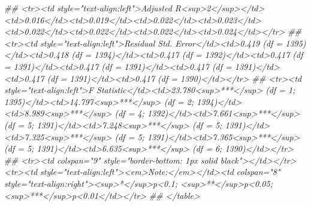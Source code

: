 \documentclass[
]{article}
\newenvironment{Shaded}{\begin{snugshade}}{\end{snugshade}}
\newcommand{\CommentTok}[1]{\textcolor[rgb]{0.56,0.35,0.01}{\textit{#1}}}
\begin{document}
\begin{Shaded}
\begin{Highlighting}[]
{{{{{{{{{{{{{{\CommentTok{## <tr><td style="text-align:left">Adjusted R<sup>2</sup></td><td>0.016</td><td>0.019</td><td>0.022</td><td>0.023</td><td>0.022</td><td>0.022</td><td>0.022</td><td>0.024</td></tr>}
\CommentTok{## <tr><td style="text-align:left">Residual Std. Error</td><td>0.419 (df = 1395)</td><td>0.418 (df = 1394)</td><td>0.417 (df = 1392)</td><td>0.417 (df = 1391)</td><td>0.417 (df = 1391)</td><td>0.417 (df = 1391)</td><td>0.417 (df = 1391)</td><td>0.417 (df = 1390)</td></tr>}
\CommentTok{## <tr><td style="text-align:left">F Statistic</td><td>23.780<sup>***</sup> (df = 1; 1395)</td><td>14.797<sup>***</sup> (df = 2; 1394)</td><td>8.989<sup>***</sup> (df = 4; 1392)</td><td>7.661<sup>***</sup> (df = 5; 1391)</td><td>7.248<sup>***</sup> (df = 5; 1391)</td><td>7.325<sup>***</sup> (df = 5; 1391)</td><td>7.365<sup>***</sup> (df = 5; 1391)</td><td>6.635<sup>***</sup> (df = 6; 1390)</td></tr>}
\CommentTok{## <tr><td colspan="9" style="border-bottom: 1px solid black"></td></tr><tr><td style="text-align:left"><em>Note:</em></td><td colspan="8" style="text-align:right"><sup>*</sup>p<0.1; <sup>**</sup>p<0.05; <sup>***</sup>p<0.01</td></tr>}
\CommentTok{## </table>}


}}}}}}}}}}}}}}
\end{Highlighting}
\end{Shaded}
\end{document}
